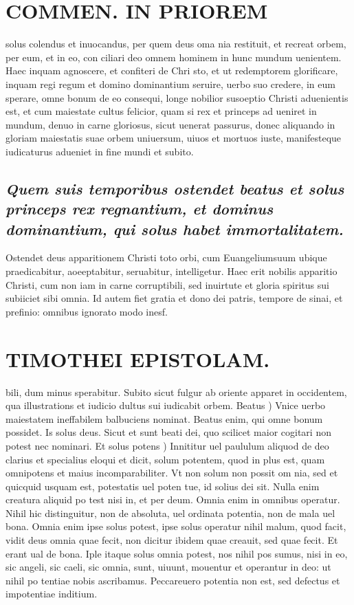 \documentclass{article}
\begin{document}
\begin{pages}
\section*{COMMEN. IN PRIOREM }
\marginpar{[ p.174 ]}\pstart solus colendus et inuocandus, per quem deus oma nia restituit, et recreat orbem, per eum, et in eo, con ciliari deo omnem hominem in hunc mundum uenientem. Haec inquam agnoscere, et confiteri de Chri sto, et ut redemptorem glorificare, inquam regi regum et domino dominantium seruire, uerbo suo credere, in eum sperare, omne bonum de eo consequi, longe nobilior susoeptio Christi aduenientis est, et cum maiestate cultus felicior, quam si rex et princeps ad ueniret in mundum, denuo in carne gloriosus, sicut uenerat passurus, donec aliquando in gloriam maiestatis suae orbem uniuersum, uiuos et mortuos iuste, manifesteque iudicaturus adueniet in fine mundi et subito.  \pend
{}
{}
\subsection*{\textit{Quem suis temporibus ostendet beatus et solus princeps rex regnantium, et dominus dominantium, qui solus habet immortalitatem. }}\pstart Ostendet deus apparitionem Christi toto orbi, cum Euangeliumsuum ubique praedicabitur, aoeeptabitur, seruabitur, intelligetur. Haec erit nobilis apparitio Christi, cum non iam in carne corruptibili, sed inuirtute et gloria spiritus sui subiiciet sibi omnia. Id autem fiet gratia et dono dei patris, tempore de sinai, et prefinio: omnibus ignorato modo inesf.  \pend
\section*{TIMOTHEI EPISTOLAM. }
\marginpar{[ p.175 ]}\pstart bili, dum minus sperabitur. Subito sicut fulgur ab oriente apparet in occidentem, qua illustrations et iudicio dultus sui iudicabit orbem.  \pend\pstart Beatus ) Vnice uerbo maiestatem ineffabilem balbuciens nominat. Beatus enim, qui omne bonum possidet. Is solus deus. Sicut et sunt beati dei, quo scilicet maior cogitari non potest nec nominari.  \pend\pstart Et solus potens ) Innititur uel paululum aliquod de deo clarius et specialius eloqui et dicit, solum potentem, quod in plus est, quam omnipotens et maius incomparabiliter. Vt non solum non possit om nia, sed et quicquid usquam est, potestatis uel poten tue, id solius dei sit. Nulla enim creatura aliquid po test nisi in, et per deum. Omnia enim in omnibus operatur. Nihil hic distinguitur, non de absoluta, uel ordinata potentia, non de mala uel bona. Omnia enim ipse solus potest, ipse solus operatur nihil malum, quod facit, vidit deus omnia quae fecit, non dicitur ibidem quae creauit, sed quae fecit. Et erant ual de bona. Iple itaque solus omnia potest, nos nihil pos sumus, nisi in eo, sic angeli, sic caeli, sic omnia, sunt, uiuunt, mouentur et operantur in deo: ut nihil po tentiae nobis ascribamus. Peccareuero potentia non est, sed defectus et impotentiae inditium.  \pend

\end{pages}
\end{document}
